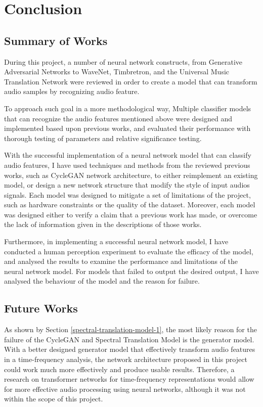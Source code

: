 \documentclass[12pt,a4paper,]{report}
\begin{document}
\hypertarget{conclusion}{%
\chapter{Conclusion}\label{conclusion}}

\hypertarget{summary-of-works}{%
\section{Summary of Works}\label{summary-of-works}}

During this project, a number of neural network constructs, from
Generative Adversarial Networks to WaveNet, Timbretron, and the
Universal Music Translation Network were reviewed in order to create a
model that can transform audio samples by recognizing audio feature.

To approach such goal in a more methodological way, Multiple classifier
models that can recognize the audio features mentioned above were
designed and implemented based upon previous works, and evaluated their
performance with thorough testing of parameters and relative
significance testing.

With the successful implementation of a neural network model that can
classify audio features, I have used techniques and methods from the
reviewed previous works, such as CycleGAN network architecture, to
either reimplement an existing model, or design a new network structure
that modify the style of input audios signals. Each model was designed
to mitigate a set of limitations of the project, such as hardware
constraints or the quality of the dataset. Moreover, each model was
designed either to verify a claim that a previous work has made, or
overcome the lack of information given in the descriptions of those
works.

Furthermore, in implementing a successful neural network model, I have
conducted a human perception experiment to evaluate the efficacy of the
model, and analysed the results to examine the performance and
limitations of the neural network model. For models that failed to
output the desired output, I have analysed the behaviour of the model
and the reason for failure.

\hypertarget{future-works}{%
\section{Future Works}\label{future-works}}

As shown by Section \ref{spectral-translation-model-1}, the most likely
reason for the failure of the CycleGAN and Spectral Translation Model is
the generator model. With a better designed generator model that
effectively transform audio features in a time-frequency analysis, the
network architecture proposed in this project could work much more
effectively and produce usable results. Therefore, a research on
transformer networks for time-frequency representations would allow for
more effective audio processing using neural networks, although it was
not within the scope of this project.
\end{document}
